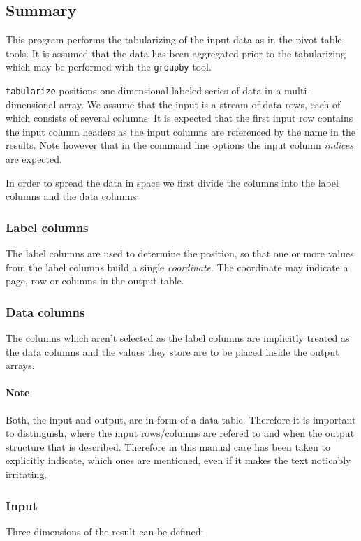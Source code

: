 \documentclass{report}
\begin{document}
\subsection{Summary}
This program performs the tabularizing of the input data as in the pivot table
tools. It is assumed that the data has been aggregated prior to the tabularizing
which may be performed with the \texttt{groupby} tool.

\texttt{tabularize} positions one-dimensional labeled series of data in a
multi-dimensional array. We assume that the input is a stream of data rows,
each of which consists of several columns. It is expected that the first input 
row contains the input column headers as the input columns are referenced by the
name in the results. Note however that in the command line options the input
column \textit{indices} are expected.

In order to spread the data in space we first divide the columns into the
label columns and the data columns.

\subsubsection{Label columns}
The label columns are used to determine the position, so that one or more values
from the label columns build a single \textit{coordinate}. The coordinate may
indicate a page, row or columns in the output table.

\subsubsection{Data columns}
The columns which aren't selected as the label columns are implicitly treated as
the data columns and the values they store are to be placed inside the output
arrays.

\paragraph{Note}
Both, the input and output, are in form of a data table. Therefore it is important
to distinguish, where the input rows/columns are refered to and when the output
structure that is described. Therefore in this manual care has been taken 
to explicitly indicate, which ones are mentioned, even if it makes the text
noticably irritating.

\subsubsection{Input}
Three dimensions of the result can be defined:
\end{document}
